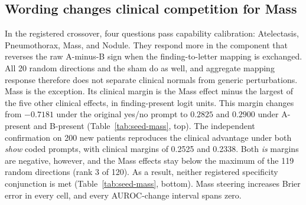 \documentclass[11pt]{article}
\begin{document}
\subsection{Wording changes clinical competition for Mass}
\label{sec:encoding-results}

In the registered crossover, four questions pass capability calibration: Atelectasis, Pneumothorax, Mass, and Nodule. They respond more in the component that reverses the raw A-minus-B sign when the finding-to-letter mapping is exchanged. All 20 random directions and the sham do as well, and aggregate mapping response therefore does not separate clinical normals from generic perturbations. Mass is the exception. Its clinical margin is the Mass effect minus the largest of the five other clinical effects, in finding-present logit units. This margin changes from $-0.7181$ under the original yes/no prompt to $0.2825$ and $0.2900$ under A-present and B-present (Table~\ref{tab:seed-mass}, top). The independent confirmation on 200 new patients reproduces the clinical advantage under both \textit{show} coded prompts, with clinical margins of 0.2525 and 0.2338. Both \textit{is} margins are negative, however, and the Mass effects stay below the maximum of the 119 random directions (rank 3 of 120). As a result, neither registered specificity conjunction is met (Table~\ref{tab:seed-mass}, bottom). Mass steering increases Brier error in every cell, and every AUROC-change interval spans zero.
\begin{table}[tp]
\centering
\setlength{\tabcolsep}{3pt}
\caption{\textbf{Mass clinical competition across prompts.} The clinical margin is the Mass effect minus the largest of the five other clinical effects, in finding-present logit units. Top: the discovery crossover, one row per prompt; bottom: the registered confirmation on new patients.}
\label{tab:seed-mass}
\end{table}
\end{document}
